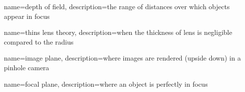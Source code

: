 {
  name=depth of field,
  description={the range of distances over which objects appear in focus}
}

{
  name=thins lens theory,
  description={when the thickness of lens is negligible compared to the radius}
}

{
  name=image plane,
  description={where images are rendered (upside down) in a pinhole camera}
}

{
  name=focal plane,
  description={where an object is perfectly in focus}
}
